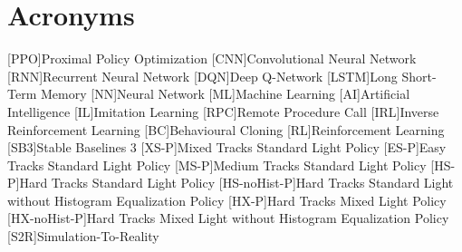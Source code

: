 \chapter*{Acronyms}

\begin{acronym}
    [PPO]{Proximal Policy Optimization}
    [CNN]{Convolutional Neural Network}
    [RNN]{Recurrent Neural Network}
    [DQN]{Deep Q-Network}
    [LSTM]{Long Short-Term Memory}
    [NN]{Neural Network}
    [ML]{Machine Learning}
    [AI]{Artificial Intelligence}
    [IL]{Imitation Learning}
    [RPC]{Remote Procedure Call}
    [IRL]{Inverse Reinforcement Learning}
    [BC]{Behavioural Cloning}
    [RL]{Reinforcement Learning}
    [SB3]{Stable Baselines 3}
    [XS-P]{Mixed Tracks Standard Light Policy}
    [ES-P]{Easy Tracks Standard Light Policy}
    [MS-P]{Medium Tracks Standard Light Policy}
    [HS-P]{Hard Tracks Standard Light Policy}
    [HS-noHist-P]{Hard Tracks Standard Light without Histogram Equalization Policy}
    [HX-P]{Hard Tracks Mixed Light Policy} %
    [HX-noHist-P]{Hard Tracks Mixed Light without Histogram Equalization Policy}
    [S2R]{Simulation-To-Reality}
\end{acronym}


